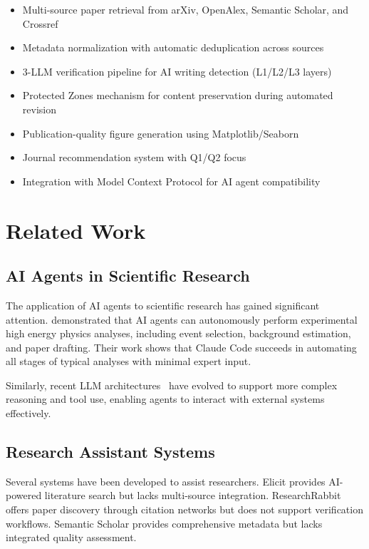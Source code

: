 \documentclass{article}
\begin{document}
\begin{itemize}
    \item Multi-source paper retrieval from arXiv, OpenAlex, Semantic Scholar, and Crossref
    \item Metadata normalization with automatic deduplication across sources
    \item 3-LLM verification pipeline for AI writing detection (L1/L2/L3 layers)
    \item Protected Zones mechanism for content preservation during automated revision
    \item Publication-quality figure generation using Matplotlib/Seaborn
    \item Journal recommendation system with Q1/Q2 focus
    \item Integration with Model Context Protocol for AI agent compatibility
\end{itemize}

\section{Related Work}
\label{sec:related_work}

\subsection{AI Agents in Scientific Research}

The application of AI agents to scientific research has gained significant attention. \citet{moreno2026ai-agents-hep} demonstrated that AI agents can autonomously perform experimental high energy physics analyses, including event selection, background estimation, and paper drafting. Their work shows that Claude Code succeeds in automating all stages of typical analyses with minimal expert input.

Similarly, recent LLM architectures~\citep{raschka2025llm-arch-comparison} have evolved to support more complex reasoning and tool use, enabling agents to interact with external systems effectively.

\subsection{Research Assistant Systems}

Several systems have been developed to assist researchers. Elicit provides AI-powered literature search but lacks multi-source integration. ResearchRabbit offers paper discovery through citation networks but does not support verification workflows. Semantic Scholar provides comprehensive metadata but lacks integrated quality assessment.
\end{document}

